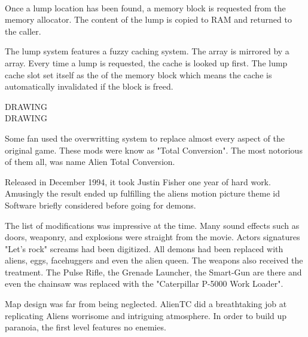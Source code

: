 \par
{}\\
\par
Once a lump location has been found, a memory block is requested from the memory allocator. The content of the lump is copied to RAM and returned to the caller. \\
\par
The lump system features a fuzzy caching system. The  array is mirrored by a  array. Every time a lump is requested, the cache is looked up first. The lump cache slot set itself as the  of the memory block which means the cache is automatically invalidated if the block is freed.\\
\par
DRAWING\\
\vspace{7cm}
DRAWING\\
\par
{}



Some fan used the overwritting system to replace almost every aspect of the original game. These mods were know as "Total Conversion". The most notorious of them all, was name Alien Total Conversion.\\
\par
Released in December 1994, it took Justin Fisher one year of hard work. Amusingly the result ended up fulfilling the aliens motion picture theme id Software briefly considered before going for demons.\\
\par
 \par
 The list of modifications was impressive at the time. Many sound effects such as doors, weaponry, and explosions were straight from the movie. Actors signatures "Let's rock" screams had been digitized. All demons had been replaced with aliens, eggs, facehuggers and even the alien queen.
The weapons also received the treatment. The Pulse Rifle, the Grenade Launcher, the Smart-Gun are there and even the chainsaw was replaced with the "Caterpillar P-5000 Work Loader".\\
\par
Map design was far from being neglected. AlienTC did a breathtaking job at replicating Aliens worrisome and intriguing atmosphere. In order to build up paranoia, the first level features no enemies.
